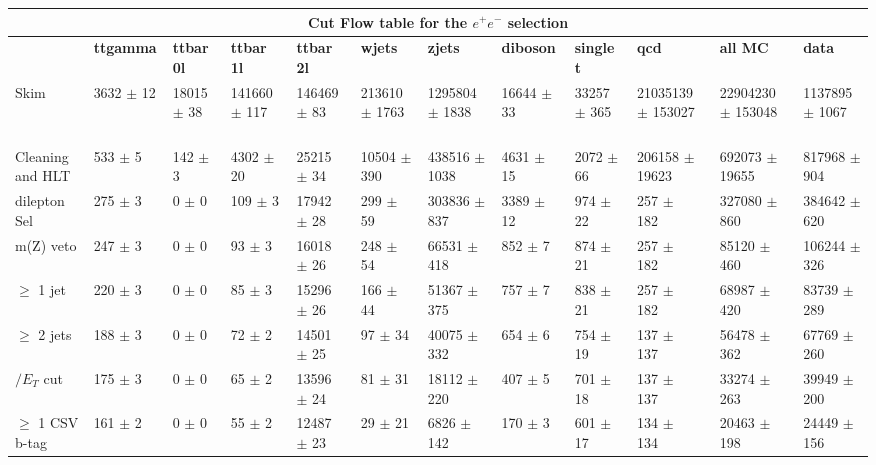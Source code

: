 \begin{table}
  \centering
\resizebox{\columnwidth}{!} {

\begin{tabular}{|l|l|l|l|l|l|l|l|l|l|l|l|}
\hline
\multicolumn{12}{|c|}{\textbf{Cut Flow table for the $e^+e^-$ selection}} \\
\hline
& \textbf{ttgamma} & \textbf{ttbar 0l} & \textbf{ttbar 1l} & \textbf{ttbar 2l} & \textbf{wjets} & \textbf{zjets} & \textbf{diboson} & \textbf{single t} & \textbf{qcd} & \textbf{all MC} & \textbf{data} \\
\hline
Skim & 3632 $\pm$ 12 \ & 18015 $\pm$ 38 \ & 141660 $\pm$ 117 \ & 146469 $\pm$ 83 \ & 213610 $\pm$ 1763 \ & 1295804 $\pm$ 1838 \ & 16644 $\pm$ 33 \ & 33257 $\pm$ 365 \ & 21035139 $\pm$ 153027\ & 22904230 $\pm$ 153048 \ & 1137895 $\pm$ 1067 \\
Cleaning and HLT & 533 $\pm$ 5 \ & 142 $\pm$ 3 \ & 4302 $\pm$ 20 \ & 25215 $\pm$ 34 \ & 10504 $\pm$ 390 \ & 438516 $\pm$ 1038 \ & 4631 $\pm$ 15 \ & 2072 $\pm$ 66 \ & 206158 $\pm$ 19623\ & 692073 $\pm$ 19655 \ & 817968 $\pm$ 904 \\
dilepton Sel & 275 $\pm$ 3 \ & 0 $\pm$ 0 \ & 109 $\pm$ 3 \ & 17942 $\pm$ 28 \ & 299 $\pm$ 59 \ & 303836 $\pm$ 837 \ & 3389 $\pm$ 12 \ & 974 $\pm$ 22 \ & 257 $\pm$ 182\ & 327080 $\pm$ 860 \ & 384642 $\pm$ 620 \\
m(Z) veto & 247 $\pm$ 3 \ & 0 $\pm$ 0 \ & 93 $\pm$ 3 \ & 16018 $\pm$ 26 \ & 248 $\pm$ 54 \ & 66531 $\pm$ 418 \ & 852 $\pm$ 7 \ & 874 $\pm$ 21 \ & 257 $\pm$ 182\ & 85120 $\pm$ 460 \ & 106244 $\pm$ 326 \\
$\geq$ 1 jet & 220 $\pm$ 3 \ & 0 $\pm$ 0 \ & 85 $\pm$ 3 \ & 15296 $\pm$ 26 \ & 166 $\pm$ 44 \ & 51367 $\pm$ 375 \ & 757 $\pm$ 7 \ & 838 $\pm$ 21 \ & 257 $\pm$ 182\ & 68987 $\pm$ 420 \ & 83739 $\pm$ 289 \\
$\geq$ 2 jets & 188 $\pm$ 3 \ & 0 $\pm$ 0 \ & 72 $\pm$ 2 \ & 14501 $\pm$ 25 \ & 97 $\pm$ 34 \ & 40075 $\pm$ 332 \ & 654 $\pm$ 6 \ & 754 $\pm$ 19 \ & 137 $\pm$ 137\ & 56478 $\pm$ 362 \ & 67769 $\pm$ 260 \\
$\slash{E_{T}}$ cut & 175 $\pm$ 3 \ & 0 $\pm$ 0 \ & 65 $\pm$ 2 \ & 13596 $\pm$ 24 \ & 81 $\pm$ 31 \ & 18112 $\pm$ 220 \ & 407 $\pm$ 5 \ & 701 $\pm$ 18 \ & 137 $\pm$ 137\ & 33274 $\pm$ 263 \ & 39949 $\pm$ 200 \\
$\geq$ 1 CSV b-tag & 161 $\pm$ 2 \ & 0 $\pm$ 0 \ & 55 $\pm$ 2 \ & 12487 $\pm$ 23 \ & 29 $\pm$ 21 \ & 6826 $\pm$ 142 \ & 170 $\pm$ 3 \ & 601 $\pm$ 17 \ & 134 $\pm$ 134\ & 20463 $\pm$ 198 \ & 24449 $\pm$ 156 \\

\end{tabular}}
\end{table}
